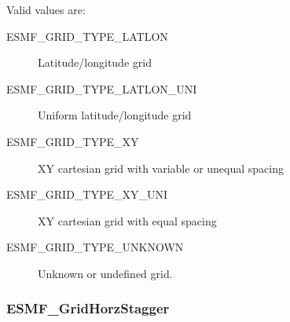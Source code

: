 Valid values are:
\begin{description}
   \item [ESMF\_GRID\_TYPE\_LATLON]
         Latitude/longitude grid

   \item [ESMF\_GRID\_TYPE\_LATLON\_UNI]
         Uniform latitude/longitude grid

   \item [ESMF\_GRID\_TYPE\_XY]
         XY cartesian grid with variable or unequal spacing

   \item [ESMF\_GRID\_TYPE\_XY\_UNI]
         XY cartesian grid with equal spacing

   \item [ESMF\_GRID\_TYPE\_UNKNOWN]
         Unknown or undefined grid.

\end{description}

\subsubsection{ESMF\_GridHorzStagger}

